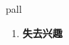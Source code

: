 
\begin{frame}
{\huge pall}
\begin{center}
\begin{enumerate}\Large
  \item \textbf{失去兴趣}
\end{enumerate}
\end{center}
\end{frame}
